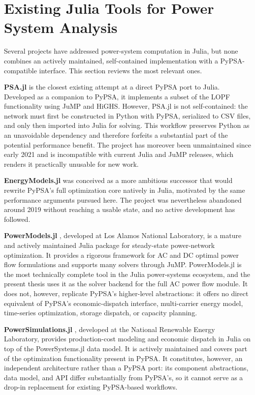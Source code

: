\section{Existing Julia Tools for Power System Analysis}

Several projects have addressed power-system computation in Julia, but none combines an actively maintained, self-contained implementation with a PyPSA-compatible interface. This section reviews the most relevant ones.

\textbf{PSA.jl} \cite{psajl2021} is the closest existing attempt at a direct PyPSA port to Julia. Developed as a companion to PyPSA, it implements a subset of the LOPF functionality using JuMP and HiGHS. However, PSA.jl is not self-contained: the network must first be constructed in Python with PyPSA, serialized to CSV files, and only then imported into Julia for solving. This workflow preserves Python as an unavoidable dependency and therefore forfeits a substantial part of the potential performance benefit. The project has moreover been unmaintained since early 2021 and is incompatible with current Julia and JuMP releases, which renders it practically unusable for new work.

\textbf{EnergyModels.jl} \cite{energymodelsjl2019} was conceived as a more ambitious successor that would rewrite PyPSA's full optimization core natively in Julia, motivated by the same performance arguments pursued here. The project was nevertheless abandoned around 2019 without reaching a usable state, and no active development has followed.

\textbf{PowerModels.jl} \cite{coffrin2018powermodels}, developed at Los Alamos National Laboratory, is a mature and actively maintained Julia package for steady-state power-network optimization. It provides a rigorous framework for AC and DC optimal power flow formulations and supports many solvers through JuMP. PowerModels.jl is the most technically complete tool in the Julia power-systems ecosystem, and the present thesis uses it as the solver backend for the full AC power flow module. It does not, however, replicate PyPSA's higher-level abstractions: it offers no direct equivalent of PyPSA's economic-dispatch interface, multi-carrier energy model, time-series optimization, storage dispatch, or capacity planning.

\textbf{PowerSimulations.jl} \cite{lara2021powersimulations}, developed at the National Renewable Energy Laboratory, provides production-cost modeling and economic dispatch in Julia on top of the PowerSystems.jl data model. It is actively maintained and covers part of the optimization functionality present in PyPSA. It constitutes, however, an independent architecture rather than a PyPSA port: its component abstractions, data model, and API differ substantially from PyPSA's, so it cannot serve as a drop-in replacement for existing PyPSA-based workflows.

